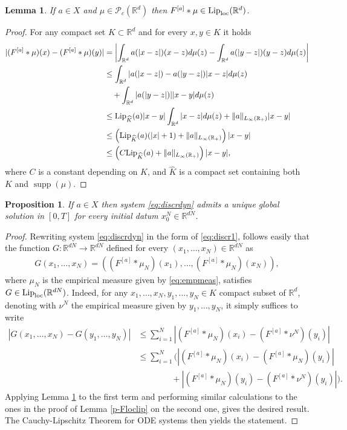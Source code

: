 \documentclass[A4paper,11pt]{article}
\newtheorem{lemma}[theorem]{Lemma}
\newtheorem{proposition}[theorem]{Proposition}
\theoremstyle{definition}
\newcommand{\Lip}{\textup{Lip}}
\newcommand{\loc}{\textup{loc}}
\newcommand{\R}{\mathbb{R}}
\DeclareMathOperator{\supp}{supp}
\newcommand{\Fun}[1]{F^{[#1]}}
\begin{document}
\begin{lemma}\label{p-Fmuloclip}
If $a\in X$ and $\mu \in \mathcal{P}_c(\R^d)$ then $\Fun{a}*\mu \in \Lip_{\loc}(\R^d)$.
\end{lemma}
\begin{proof}
For any compact set $K \subset \R^d$ and for every $x,y \in K$ it holds
\begin{align*}
|(\Fun{a}*\mu)(x) - (\Fun{a}*\mu)(y)| &= \left|\int_{\R^d}a(|x-z|)(x-z)d\mu(z) - \int_{\R^d}a(|y-z|)(y-z)d\mu(z)\right| \\
&\leq \int_{\R^d}|a(|x-z|)-a(|y-z|)|x-z|d\mu(z)\\
&\quad+ \int_{\R^d}|a(|y-z|)||x-y|d\mu(z) \\
&\leq \Lip_{\widehat{K}}(a)|x-y| \int_{\R^d}|x-z|d\mu(z) + \|a\|_{L_{\infty}(\R_+)}|x-y| \\
&\leq \left(\Lip_{\widehat{K}}(a)(|x| + 1)+ \|a\|_{L_{\infty}(\R_+)}\right)|x-y| \\
& \leq \left(C\Lip_{\widehat{K}}(a) + \|a\|_{L_{\infty}(\R_+)} \right)|x-y|,
\end{align*}
where $C$ is a constant depending on $K$, and $\widehat{K}$ is a compact set containing both $K$ and $\supp(\mu)$.
\end{proof}



\begin{proposition}
If $a \in X$ then system \eqref{eq:discrdyn} admits a unique global solution in $[0,T]$ for every initial datum $x^{N}_0 \in \R^{dN}$.
\end{proposition}
\begin{proof}
Rewriting system \eqref{eq:discrdyn} in the form of \eqref{eq:discr1}, follows easily that the function $G:\R^{dN} \rightarrow \R^{dN}$ defined for every $(x_1, \ldots, x_N)\in \R^{dN}$ as
\begin{align*}
G(x_1, \ldots, x_N) = ((\Fun{a}*\mu_N)(x_1),\ldots,(\Fun{a}*\mu_N)(x_N)),
\end{align*}
where $\mu_N$ is the empirical measure given by \eqref{eq:empmeas}, satisfies $G \in \Lip_\loc(\R^{dN})$. Indeed, for any $x_1, \ldots, x_N, y_1, \ldots, y_N \in K$ compact subset of $\R^d$, denoting with $\nu^N$ the empirical measure given by $y_1, \ldots, y_N$, it simply suffices to write
\begin{align*}
|G(x_1, \ldots, x_N) - G(y_1,\ldots,y_N)| &\leq \sum^N_{i = 1} |(\Fun{a}*\mu_N)(x_i) - (\Fun{a}*\nu^N)(y_i)| \\
&\leq \sum^N_{i = 1} \Bigg( |(\Fun{a}*\mu_N)(x_i) - (\Fun{a}*\mu_N)(y_i)| \\
&\quad \quad \quad \quad +|(\Fun{a}*\mu_N)(y_i) - (\Fun{a}*\nu^N)(y_i)| \Bigg).
\end{align*}
Applying Lemma \ref{p-Fmuloclip} to the first term and performing similar calculations to the ones in the proof of Lemma \ref{p-Floclip} on the second one, gives the desired result. The Cauchy-Lipschitz Theorem for ODE systems then yields the statement.
\end{proof}
\end{document}

